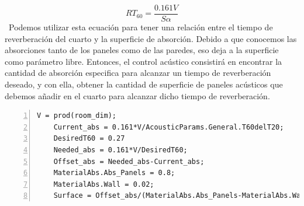 \begin{displaymath}
    RT_{60} = \frac{0.161 V}{S \alpha}
\end{displaymath}\
Podemos utilizar esta ecuación para tener una relación entre el tiempo de reverberación del cuarto y la superficie de absorción. Debido a que conocemos las absorciones tanto de los paneles como de las paredes, eso deja a la superficie como parámetro libre. Entonces, el control acústico consistirá en encontrar la cantidad de absorción especifica para alcanzar un tiempo de reverberación deseado, y con ella, obtener la cantidad de superficie de paneles acústicos que debemos añadir en el cuarto para alcanzar dicho tiempo de reverberación.
\begin{lstlisting}[frame=single,numbers=left, style=Matlab-editor, basicstyle=\tiny]
    V = prod(room_dim);
    Current_abs = 0.161*V/AcousticParams.General.T60delT20;
    DesiredT60 = 0.27
    Needed_abs = 0.161*V/DesiredT60;
    Offset_abs = Needed_abs-Current_abs;
    MaterialAbs.Abs_Panels = 0.8;
    MaterialAbs.Wall = 0.02;
    Surface = Offset_abs/(MaterialAbs.Abs_Panels-MaterialAbs.Wall)
\end{lstlisting}

